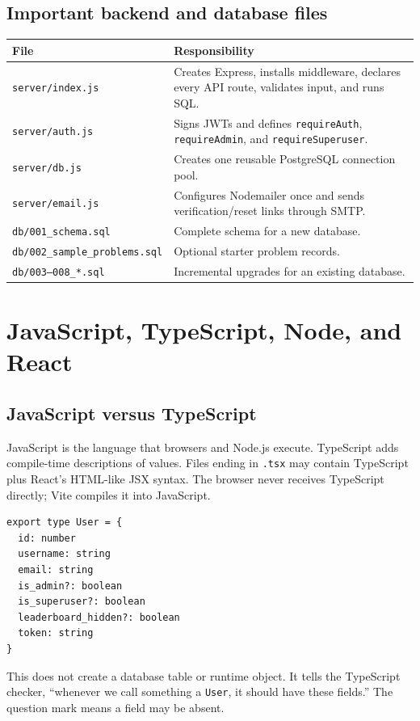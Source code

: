 \documentclass[11pt,oneside]{book}
\newcommand{\file}[1]{\texttt{#1}}
\newcommand{\code}[1]{\texttt{#1}}
\begin{document}
\section{Important backend and database files}
\begin{longtable}{p{} p{}}
\toprule
File & Responsibility \\
\midrule
\endhead
\file{server/index.js} & Creates Express, installs middleware, declares every API route, validates input, and runs SQL. \\
\file{server/auth.js} & Signs JWTs and defines \code{requireAuth}, \code{requireAdmin}, and \code{requireSuperuser}. \\
\file{server/db.js} & Creates one reusable PostgreSQL connection pool. \\
\file{server/email.js} & Configures Nodemailer once and sends verification/reset links through SMTP. \\
\file{db/001\_schema.sql} & Complete schema for a new database. \\
\file{db/002\_sample\_problems.sql} & Optional starter problem records. \\
\file{db/003--008\_*.sql} & Incremental upgrades for an existing database. \\
\bottomrule
\end{longtable}

\chapter{JavaScript, TypeScript, Node, and React}

\section{JavaScript versus TypeScript}
JavaScript is the language that browsers and Node.js execute. TypeScript adds compile-time descriptions of values. Files ending in \file{.tsx} may contain TypeScript plus React's HTML-like JSX syntax. The browser never receives TypeScript directly; Vite compiles it into JavaScript.

\begin{lstlisting}[title={src/types/user.ts --- a TypeScript type}]
export type User = {
  id: number
  username: string
  email: string
  is_admin?: boolean
  is_superuser?: boolean
  leaderboard_hidden?: boolean
  token: string
}
\end{lstlisting}

This does not create a database table or runtime object. It tells the TypeScript checker, ``whenever we call something a \code{User}, it should have these fields.'' The question mark means a field may be absent.
\end{document}
